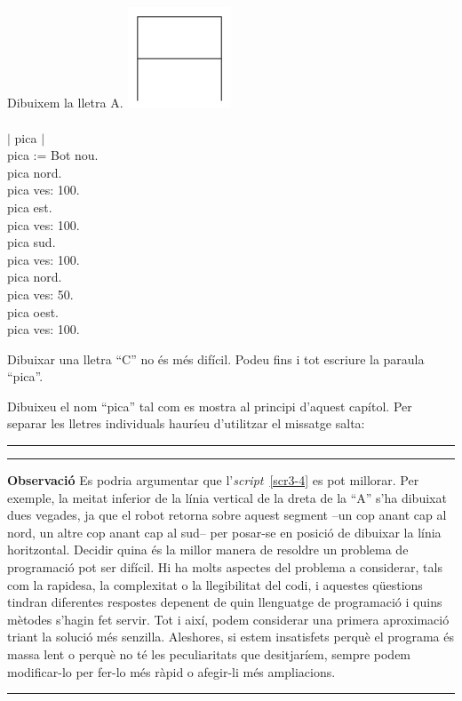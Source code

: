 \begin{script}  Dibuixem la lletra A.
\newline
\noindent
\includegraphics[height=30mm ,width=31mm]{Imatges/figuraS3-4.png}
\noindent
\textsf{\upshape
\\
\\$|$ pica $|$\\
pica := Bot nou.\\
pica nord.\\
pica ves: 100.\\
pica est.\\
pica ves: 100.\\
pica sud.\\
pica ves: 100.\\
pica nord.\\
pica ves: 50.\\
pica oest.\\
pica ves: 100.\\
}
\label{scr3-4}
\end{script}

Dibuixar una lletra ``C'' no és més difícil. Podeu fins i tot escriure la paraula ``pica''.

\begin{center}
\colorbox{black}{}
\end{center}
{\small
\noindent
Dibuixeu el nom ``pica'' tal com es mostra al principi d'aquest capítol. Per separar les lletres individuals hauríeu d'utilitzar el missatge \textsf{salta:}}\\
\noindent
\rule{\textwidth}{3pt}

\newpage

\noindent
\rule{\textwidth}{2pt}
\noindent
\textbf{Observació} Es podria argumentar que l'\emph{script}~\ref{scr3-4} es pot millorar. Per exemple, la meitat inferior de la línia vertical de la dreta de la ``A'' s'ha dibuixat dues vegades, ja que el robot retorna sobre aquest segment --un cop anant cap al nord, un altre cop anant cap al sud-- per posar-se en posició de dibuixar la línia horitzontal. Decidir quina és la millor manera de resoldre un problema de programació pot ser difícil. Hi ha molts aspectes del problema a considerar, tals com la rapidesa, la complexitat o la llegibilitat del codi, i aquestes qüestions tindran diferentes respostes depenent de quin llenguatge de programació i quins mètodes s'hagin fet servir. Tot i així, podem considerar una primera aproximació triant la solució més senzilla. Aleshores, si estem insatisfets perquè el programa és massa lent o perquè no té les peculiaritats que desitjaríem, sempre podem modificar-lo per fer-lo més ràpid o afegir-li més ampliacions.\\
\noindent
\rule{\textwidth}{2pt}
